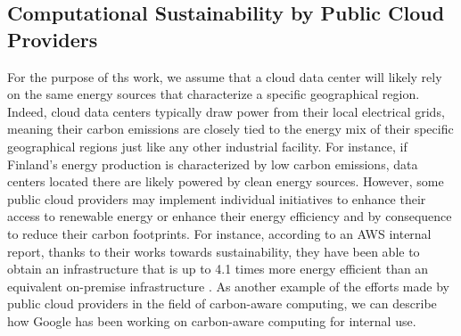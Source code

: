 
\subsection{Computational Sustainability by Public Cloud Providers}

For the purpose of ths work, we assume that a cloud data center will likely rely on the same energy sources that characterize a specific geographical region.
Indeed, cloud data centers typically draw power from their local electrical grids, meaning their carbon emissions are closely tied to the energy mix of their specific geographical regions just like any other industrial facility.
For instance, if Finland's energy production is characterized by low carbon emissions, data centers located there are likely powered by clean energy sources. 
However, some public cloud providers may implement individual initiatives to enhance their access to renewable energy or enhance their energy efficiency and by consequence to reduce their carbon footprints.
For instance, according to an AWS internal report, thanks to their works towards sustainability, they have been able to obtain an infrastructure that is up to 4.1 times more energy efficient than an equivalent on-premise infrastructure \cite{aws_sustainability}.
As another example of the efforts made by public cloud providers in the field of carbon-aware computing, we can describe how Google has been working on carbon-aware computing for internal use. 
